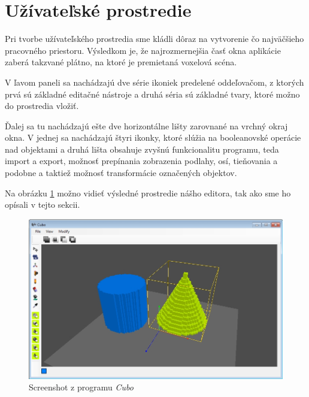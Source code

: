 \section{Užívateľské prostredie}
Pri tvorbe užívateľského prostredia sme kládli dôraz na vytvorenie čo najväčšieho pracovného priestoru. Výsledkom je, že najrozmernejšia časť okna aplikácie zaberá takzvané plátno, na ktoré je premietaná voxelová scéna. 

V ľavom paneli sa nachádzajú dve série ikoniek predelené oddeľovačom, z ktorých prvá sú základné editačné nástroje a druhá séria sú základné tvary, ktoré možno do prostredia vložiť. 

Ďalej sa tu nachádzajú ešte dve horizontálne lišty zarovnané na vrchný okraj okna. V jednej sa nachádzajú štyri ikonky, ktoré slúžia na booleanovské operácie nad objektami a druhá lišta obsahuje zvyšnú funkcionalitu programu, teda import a export, možnosť prepínania zobrazenia podlahy, osí, tieňovania a podobne a taktiež možnosť transformácie označených objektov.

Na obrázku \ref{ui} možno vidieť výsledné prostredie nášho editora, tak ako sme ho opísali v tejto sekcii.\\
\begin{figure}[!h]
	\centering
	\includegraphics[width=1.0\textwidth]{UI.jpg}
	\caption[Užívateľské prostredie]{Screenshot z programu \textit{Cubo}}
	\label{ui}
\end{figure}